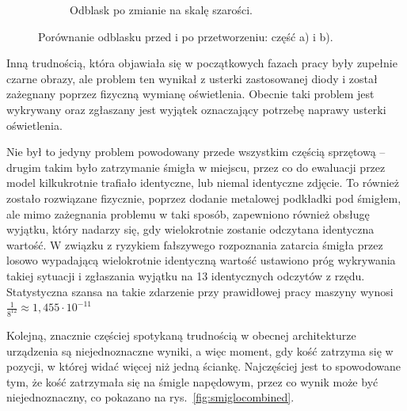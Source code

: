 \begin{figure}[H]
\begin{subfigure}[t]{0.45\linewidth}
        \caption{Odblask po zmianie na skalę szarości.}
        \label{fig:blaskproc}
    \end{subfigure}
    \caption{Porównanie odblasku przed i po przetworzeniu: część a) i b).}
    \label{fig:blaskcombined}
\end{figure}


Inną trudnością, która objawiała się w początkowych fazach pracy były zupełnie czarne obrazy, ale
problem ten wynikał z usterki zastosowanej diody i został zażegnany poprzez fizyczną wymianę oświetlenia.
Obecnie taki problem jest wykrywany oraz zgłaszany jest wyjątek oznaczający potrzebę naprawy usterki oświetlenia.

Nie był to jedyny problem powodowany przede wszystkim częścią sprzętową -- drugim takim było zatrzymanie śmigła w miejscu,
przez co do ewaluacji przez model kilkukrotnie trafiało identyczne, lub niemal identyczne zdjęcie.
To również zostało rozwiązane fizycznie, poprzez dodanie metalowej podkładki pod śmigłem,
ale mimo zażegnania problemu w taki sposób, zapewniono również obsługę wyjątku, który nadarzy się, gdy wielokrotnie zostanie odczytana identyczna wartość.
W związku z ryzykiem fałszywego rozpoznania zatarcia śmigła przez losowo wypadającą wielokrotnie identyczną wartość ustawiono próg wykrywania takiej sytuacji i zgłaszania wyjątku na 13 identycznych odczytów z rzędu.
Statystyczna szansa na takie zdarzenie przy prawidłowej pracy maszyny wynosi
$\frac{1}{8^{12}} \approx 1{,}455 \cdot 10^{-11}$

Kolejną, znacznie częściej spotykaną trudnością w obecnej architekturze urządzenia są niejednoznaczne wyniki,
a więc moment, gdy kość zatrzyma się w pozycji, w której widać więcej niż jedną ściankę.
Najczęściej jest to spowodowane tym, że kość zatrzymała się na śmigle napędowym,
przez co wynik może być niejednoznaczny, co pokazano na rys.~\ref{fig:smiglocombined}.

